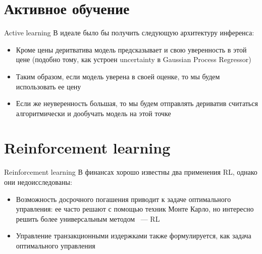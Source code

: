 \documentclass[10pt]{beamer}
\begin{document}
    \section{Активное обучение}
    \begin{frame}{Active learning}
        В идеале было бы получить следующую архитектуру инференса:
        \begin{itemize}
            \item Кроме цены деритватива модель предсказывает и свою уверенность в этой цене (подобно тому, как устроен uncertainty в Gaussian Process Regressor)
            \item Таким образом, если модель уверена в своей оценке, то мы будем использовать ее цену
            \item Если же неуверенность большая, то мы будем отправлять дериватив считаться алгоритмически и дообучать модель на этой точке
        \end{itemize}
    \end{frame}

    \section{Reinforcement learning}
    \begin{frame}{Reinforcement learning}
        В финансах хорошо известны два применения RL, однако они недоисследованы:
        \begin{itemize}
            \item Возможность досрочного погашения приводит к задаче оптимального управления: 
            ее часто решают с помощью техник Монте Карло, но интересно решить более универсальным методом ~--- RL
            \item Управление транзакционными издержками также формулируется, как задача оптимального управления
        \end{itemize}
    \end{frame}
\end{document}
